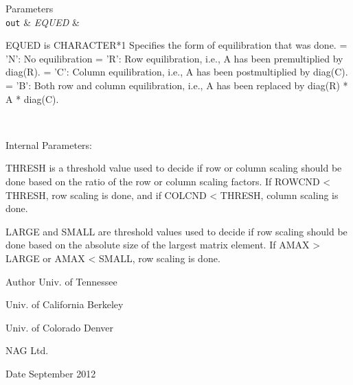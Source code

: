 \begin{DoxyParams}[1]{Parameters}
\\
\hline
\mbox{\tt out}  & {\em E\+Q\+U\+E\+D} & \begin{DoxyVerb}          EQUED is CHARACTER*1
          Specifies the form of equilibration that was done.
          = 'N':  No equilibration
          = 'R':  Row equilibration, i.e., A has been premultiplied by
                  diag(R).
          = 'C':  Column equilibration, i.e., A has been postmultiplied
                  by diag(C).
          = 'B':  Both row and column equilibration, i.e., A has been
                  replaced by diag(R) * A * diag(C).\end{DoxyVerb}
 \\
\hline
\end{DoxyParams}
\begin{DoxyParagraph}{Internal Parameters\+: }
\begin{DoxyVerb}  THRESH is a threshold value used to decide if row or column scaling
  should be done based on the ratio of the row or column scaling
  factors.  If ROWCND < THRESH, row scaling is done, and if
  COLCND < THRESH, column scaling is done.

  LARGE and SMALL are threshold values used to decide if row scaling
  should be done based on the absolute size of the largest matrix
  element.  If AMAX > LARGE or AMAX < SMALL, row scaling is done.\end{DoxyVerb}
 
\end{DoxyParagraph}
\begin{DoxyAuthor}{Author}
Univ. of Tennessee 

Univ. of California Berkeley 

Univ. of Colorado Denver 

N\+A\+G Ltd. 
\end{DoxyAuthor}
\begin{DoxyDate}{Date}
September 2012 
\end{DoxyDate}
\hypertarget{group__doubleGEauxiliary_gaa3c93490c68259c80285d72cb61cbd99}{}
